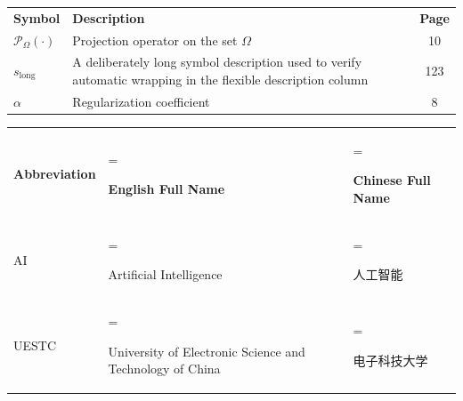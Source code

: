 \documentclass{uestcthesis}
\newcommand{\testsymbolname}{Symbol}
\newcommand{\testdescriptionname}{Description}
\newcommand{\testpagename}{Page}
\newcommand{\testabbreviationname}{Abbreviation}
\newcommand{\testenglishfullname}{English Full Name}
\newcommand{\testchinesefullname}{Chinese Full Name}
\newcommand{\testsymbolname}{符号}
\newcommand{\testdescriptionname}{说明}
\newcommand{\testpagename}{页码}
\newcommand{\testabbreviationname}{英文缩写}
\newcommand{\testenglishfullname}{英文全称}
\newcommand{\testchinesefullname}{中文全称}
\begin{document}
\uestcfrontmatter

\uestcsymbols
\begingroup
\renewcommand{\arraystretch}{1.3}
\setlength{\tabcolsep}{9pt}
\noindent
\begin{tabularx}{\linewidth}{l>{\raggedright\arraybackslash}Xc}
    \textbf{\testsymbolname} & \textbf{\testdescriptionname} & \textbf{\testpagename} \\
    $\mathcal{P}_{\Omega}(\cdot)$ & Projection operator on the set $\Omega$ & 10 \\
    $s_{\mathrm{long}}$ & A deliberately long symbol description used to verify
        automatic wrapping in the flexible description column & 123 \\
    $\alpha$ & Regularization coefficient & 8 \\
\end{tabularx}
\endgroup

\uestcacronyms
\begingroup
\renewcommand{\arraystretch}{1.3}
\setlength{\tabcolsep}{9pt}
\noindent
\begin{tabularx}{\linewidth}{%
    l
    >{\hsize=1.2\hsize\linewidth=\hsize\raggedright\arraybackslash}X
    >{\hsize=0.8\hsize\linewidth=\hsize\raggedright\arraybackslash}X}
    \textbf{\testabbreviationname} & \textbf{\testenglishfullname} &
        \textbf{\testchinesefullname} \\
    AI & Artificial Intelligence & 人工智能 \\
    UESTC & University of Electronic Science and Technology of China & 电子科技大学 \\
\end{tabularx}
\endgroup
\end{document}
